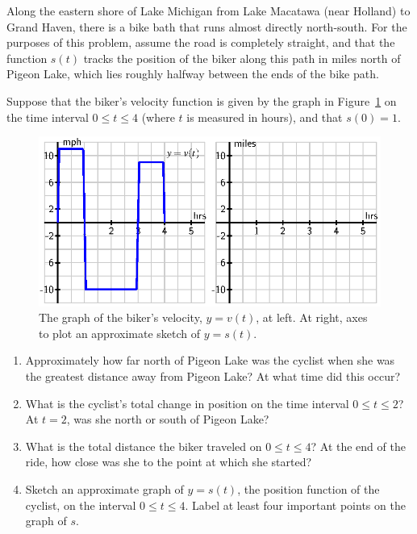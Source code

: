 \begin{exercises} 
  \item Along the eastern shore of Lake Michigan from Lake Macatawa (near Holland) to Grand Haven, there is a bike bath that runs almost directly north-south.  For the purposes of this problem, assume the road is completely straight, and that the function $s(t)$ tracks the position of the biker along this path in miles north of Pigeon Lake, which lies roughly halfway between the ends of the bike path.  
  
Suppose that the biker's velocity function is given by the graph in Figure~\ref{F:4.1.Ez1} on the time interval $0 \le t \le 4$ (where $t$ is measured in hours), and that $s(0) = 1$.
\begin{figure}[h]
\begin{center}
\includegraphics{figures/4_1_Ez1.eps}
\caption{The graph of the biker's velocity, $y = v(t)$, at left.  At right, axes to plot an approximate sketch of $y = s(t)$.} \label{F:4.1.Ez1}
\end{center}
\end{figure}
\begin{enumerate}
	\item Approximately how far north of Pigeon Lake was the cyclist when she was the greatest distance away from Pigeon Lake?  At what time did this occur?
	\item What is the cyclist's total change in position on the time interval $0 \le t \le 2$?  At $t = 2$, was she north or south of Pigeon Lake?
	\item What is the total distance the biker traveled on $0 \le t \le 4$?  At the end of the ride, how close was she to the point at which she started?
	\item Sketch an approximate graph of $y = s(t)$, the position function of the cyclist, on the interval $0 \le t \le 4$.  Label at least four important points on the graph of $s$.

\end{enumerate}
\end{exercises}
